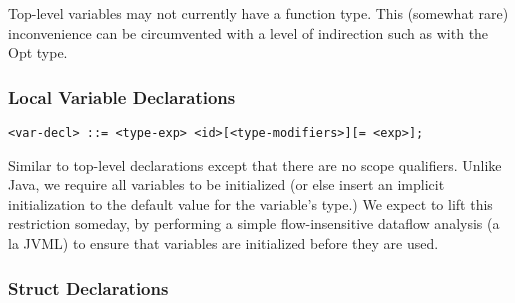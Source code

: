 \documentclass[titlepage,10pt]{article}
\begin{document}
Top-level variables may not currently have a function type.  This
(somewhat rare) inconvenience can be circumvented with a level of
indirection such as with the Opt type.

\subsubsection{Local Variable Declarations}


\begin{verbatim}
<var-decl> ::= <type-exp> <id>[<type-modifiers>][= <exp>];
\end{verbatim}

Similar to top-level declarations except that there are no scope
qualifiers.  Unlike Java, we require all variables to be initialized (or
else insert an implicit initialization to the default value for the
variable's type.)  We expect to lift this restriction someday, by
performing a simple flow-insensitive dataflow analysis (a la JVML) to
ensure that variables are initialized before they are used.

\subsubsection{Struct Declarations}
\end{document}

